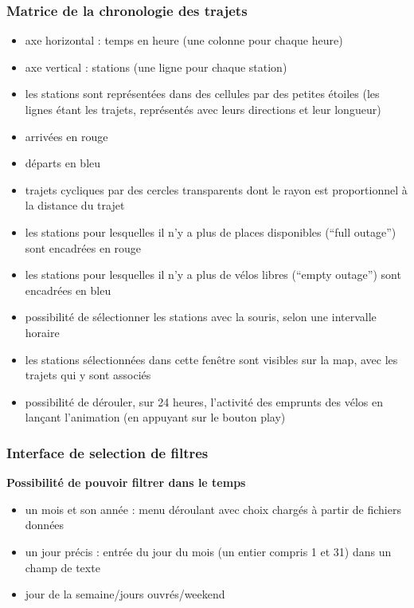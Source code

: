 \documentclass[12pt]{article}
\begin{document}
			\subsubsection{Matrice de la chronologie des trajets}
				\begin{itemize}
					\item axe horizontal : temps en heure (une colonne pour chaque heure)
					\item axe vertical : stations (une ligne pour chaque station)
					\item les stations sont représentées dans des cellules par des petites étoiles (les lignes étant les trajets, représentés avec leurs directions et leur longueur)
					\item arrivées en rouge
					\item départs en bleu
					\item trajets cycliques par des cercles transparents dont le rayon est proportionnel à la distance du trajet
					\item les stations pour lesquelles il n’y a plus de places disponibles (“full outage”) sont encadrées en rouge
					\item les stations pour lesquelles il n’y a plus de vélos libres (“empty outage”) sont encadrées en bleu
					\item possibilité de sélectionner les stations avec la souris, selon une intervalle horaire
					\item les stations sélectionnées dans cette fenêtre sont visibles sur la map, avec les trajets qui y sont associés
					\item possibilité de dérouler, sur 24 heures, l'activité des emprunts des vélos en lançant l'animation (en appuyant sur le bouton play)
				\end{itemize}

			\subsubsection{Interface de selection de filtres}
				\textbf{Possibilité de pouvoir filtrer dans le temps}\par
					\begin{itemize}
						\item un mois et son année : menu déroulant avec choix chargés à partir de fichiers données
						\item un jour précis : entrée du jour du mois (un entier compris 1 et 31) dans un champ de texte 
						\item jour de la semaine/jours ouvrés/weekend\\
					\end{itemize}
\end{document}
